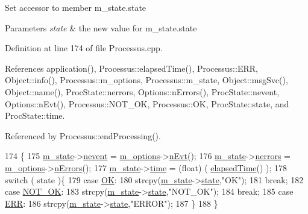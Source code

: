 Set accessor to member m\+\_\+state.\+state 
\begin{DoxyParams}{Parameters}
{\em state} & the new value for m\+\_\+state.\+state \\
\hline
\end{DoxyParams}


Definition at line 174 of file Processus.\+cpp.



References application(), Processus\+::elapsed\+Time(), Processus\+::\+E\+RR, Object\+::info(), Processus\+::m\+\_\+options, Processus\+::m\+\_\+state, Object\+::msg\+Svc(), Object\+::name(), Proc\+State\+::nerrors, Options\+::n\+Errors(), Proc\+State\+::nevent, Options\+::n\+Evt(), Processus\+::\+N\+O\+T\+\_\+\+OK, Processus\+::\+OK, Proc\+State\+::state, and Proc\+State\+::time.



Referenced by Processus\+::end\+Processing().


\begin{DoxyCode}
174                                      \{
175   \hyperlink{classProcessus_ab3539eee42891ceae0baf4395ae7fb61}{m\_state}->\hyperlink{structProcState_a1881d6b0db849a8af15f586ad5959260}{nevent}  = \hyperlink{classProcessus_a74205f3c1e00c4448f7b3257c2351797}{m\_options}->\hyperlink{classOptions_ad769b256263a4ac24dd6f989ae724ab7}{nEvt}();
176   \hyperlink{classProcessus_ab3539eee42891ceae0baf4395ae7fb61}{m\_state}->\hyperlink{structProcState_a51a0f54ba62b07e07ac8518c5f32828d}{nerrors} = \hyperlink{classProcessus_a74205f3c1e00c4448f7b3257c2351797}{m\_options}->\hyperlink{classOptions_acc6474323f0bbe17fa844e9a086b90b8}{nErrors}();
177   \hyperlink{classProcessus_ab3539eee42891ceae0baf4395ae7fb61}{m\_state}->\hyperlink{structProcState_a88c69b099d8f2b2164d478f28e87610f}{time}    = (float) ( \hyperlink{classProcessus_aecca96218c65bc805c988cd95447df55}{elapsedTime}() );
178   \textcolor{keywordflow}{switch} ( state )\{
179   \textcolor{keywordflow}{case} \hyperlink{classProcessus_a36278773bd98f2d5612fea40c7774821af77c64124fa175f28200166fff165ea2}{OK}:
180     strcpy(\hyperlink{classProcessus_ab3539eee42891ceae0baf4395ae7fb61}{m\_state}->\hyperlink{structProcState_aaffb70e5af437e2c0d4dfc69bd0b24cd}{state},\textcolor{stringliteral}{"OK"});
181     \textcolor{keywordflow}{break};
182   \textcolor{keywordflow}{case} \hyperlink{classProcessus_a36278773bd98f2d5612fea40c7774821a629082f49d6e8df6b6da2b8fbb9d80fb}{NOT\_OK}:
183     strcpy(\hyperlink{classProcessus_ab3539eee42891ceae0baf4395ae7fb61}{m\_state}->\hyperlink{structProcState_aaffb70e5af437e2c0d4dfc69bd0b24cd}{state},\textcolor{stringliteral}{"NOT\_OK"});
184     \textcolor{keywordflow}{break};
185   \textcolor{keywordflow}{case} \hyperlink{classProcessus_a36278773bd98f2d5612fea40c7774821adaf73ad5d0a09f952d0f18dbbe1c7493}{ERR}:
186     strcpy(\hyperlink{classProcessus_ab3539eee42891ceae0baf4395ae7fb61}{m\_state}->\hyperlink{structProcState_aaffb70e5af437e2c0d4dfc69bd0b24cd}{state},\textcolor{stringliteral}{"ERROR"});
187   \}
188 \}
\end{DoxyCode}
\mbox{\label{classProcessus_ad57a29b33f9021eda9f6929136f1784f}} 

